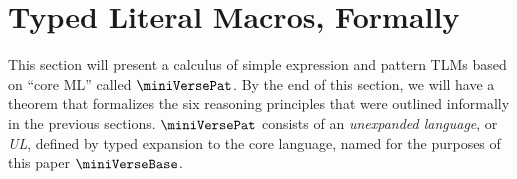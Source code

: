 \documentclass[acmsmall]{acmart}
\begin{document}
\begin{comment}
\end{comment}

\section{Typed Literal Macros, Formally}
\label{sec:setlms-formally}

This section will present a calculus of simple expression and pattern TLMs based on ``core ML'' called $\miniVersePat$. By the end of this section, we will have a theorem that formalizes the six reasoning principles that were outlined informally in the previous sections. $\miniVersePat$ consists of an \emph{unexpanded language}, or \emph{UL}, defined by typed expansion to the core language, named for the purposes of this paper $\miniVerseBase$. 
\end{document}
